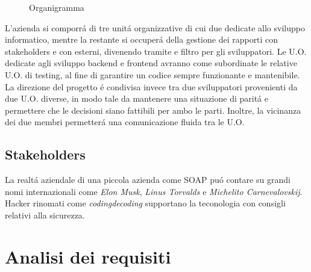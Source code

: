 \documentclass[../../documentazione.tex]{subfiles}
\begin{document}
    \begin{figure}
        \caption{Organigramma}
    \end{figure}

    L'azienda si comporrá di tre unitá organizzative di cui due dedicate allo sviluppo informatico, mentre la restante
    si occuperá della gestione dei rapporti con stakeholders e con esterni, divenendo tramite e filtro per gli sviluppatori.
    Le U.O. dedicate agli sviluppo backend e frontend avranno come subordinate le relative U.O. di testing,
    al fine di garantire un codice sempre funzionante e mantenibile.
    La direzione del progetto é condivisa invece tra due sviluppatori provenienti da due U.O. diverse, in modo tale
    da mantenere una situazione di paritá e permettere che le decisioni siano fattibili per ambo le parti.
    Inoltre, la vicinanza dei due membri permetterá una comunicazione fluida tra le U.O.

    \subsection{Stakeholders}\label{sec:steackholders}
    La realtá aziendale di una piccola azienda come SOAP puó contare su grandi nomi internazionali come
    \textit{Elon Musk}, \textit{Linus Torvalds} e \textit{Michelito Carnevalovskij}.
    Hacker rinomati come \textit{codingdecoding} supportano la teconologia con consigli relativi alla sicurezza.

    \section{Analisi dei requisiti}\label{sec:analisi-dei-requisiti}
\end{document}
